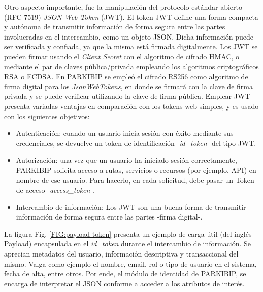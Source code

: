 Otro aspecto importante, fue la manipulación del protocolo estándar abierto (RFC 7519) \textit{JSON Web Token} (JWT). El token JWT define una forma compacta y autónoma de transmitir información de forma segura entre las partes involucradas en el intercambio, como un objeto JSON. Dicha información puede ser verificada y confiada, ya que la misma está firmada digitalmente. Los JWT se pueden firmar usando el \textit{Client Secret} con el algoritmo de cifrado HMAC, o mediante el par de claves pública/privada empleando los algoritmos criptográficos RSA o ECDSA. En PARKIBIP se empleó el cifrado RS256 como algoritmo de firma digital para los \textit{JsonWebTokens}, en donde se firmará con la clave de firma privada y se puede verificar utilizando la clave de firma pública. Emplear JWT presenta variadas ventajas en comparación con los tokens web simples, y es usado con los siguientes objetivos:

\begin{itemize}
    \item Autenticación: cuando un usuario inicia sesión con éxito mediante sus credenciales, se devuelve un token de identificación -\textit{id\_token}- del tipo JWT.
    \item Autorización: una vez que un usuario ha iniciado sesión correctamente, PARKIBIP solicita acceso a rutas, servicios o recursos (por ejemplo, API) en nombre de ese usuario. Para hacerlo, en cada solicitud, debe pasar un Token de acceso -\textit{access\_token}-.
    \item Intercambio de información: Los JWT son una buena forma de transmitir información de forma segura entre las partes -firma digital-. 
\end{itemize} 

La figura Fig. \ref{FIG:payload-token} presenta un ejemplo de carga útil (del inglés Payload) encapsulada en el \textit{id\_token} durante el intercambio de información. Se aprecian metadatos del usuario, información descriptiva y transaccional del mismo. Valga como ejemplo el nombre, email, rol o tipo de usuario en el sistema, fecha de alta, entre otros. Por ende, el módulo de identidad de PARKIBIP, se encarga de interpretar el JSON conforme a acceder a los atributos de interés.

